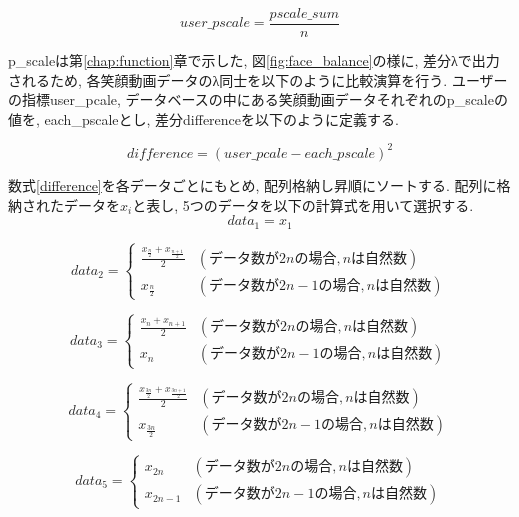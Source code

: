 \begin{equation}
\label{userpscale}
user\_pscale= \frac{pscale\_sum}{n}
\end{equation}

p\_scaleは第\ref{chap:function}章で示した, 図\ref{fig:face_balance}の様に,
差分λで出力されるため, 各笑顔動画データのλ同士を以下のように比較演算を行う.
ユーザーの指標user\_pcale, データベースの中にある笑顔動画データそれぞれのp\_scaleの値を,
each\_pscaleとし, 差分differenceを以下のように定義する.

\begin{equation}
\label{difference}
difference =
\left(
user\_pcale - each\_pscale
\right)
^2
\end{equation}

数式\ref{difference}を各データごとにもとめ, 配列格納し昇順にソートする.
配列に格納されたデータを$x_i$と表し, 5つのデータを以下の計算式を用いて選択する.
\begin{equation}
\label{data1}
data_1  = x_1
\end{equation}

\begin{equation}
\label{data2}
data_2 = \left\{ \begin{array}{ll}
\frac{x_{\frac{n}{2}} + x_{\frac{n+1}{2}} }{2} & (データ数が2nの場合,nは自然数) \\
x_{\frac{n}{2}} & (データ数が2n-1の場合,nは自然数)
\end{array} \right.\end{equation}

\begin{equation}
  \label{data3}
  data_3 = \left\{ \begin{array}{ll}
  \frac{x_n + x_{n+1} }{2} & (データ数が2nの場合,nは自然数) \\
  x_n & (データ数が2n-1の場合,nは自然数)
  \end{array} \right.\end{equation}

\begin{equation}
  \label{data4}
  data_4 = \left\{ \begin{array}{ll}
  \frac{x_{\frac{3n}{2}} + x_{\frac{3n+1}{2}} }{2} & (データ数が2nの場合,nは自然数) \\
  x_{\frac{3n}{2}} & (データ数が2n-1の場合,nは自然数)
  \end{array} \right.\end{equation}


\begin{equation}
  \label{data5}
  data_5  = \left\{ \begin{array}{ll}
  x_{2n} & (データ数が2nの場合,nは自然数) \\
  x_{2n-1} & (データ数が2n-1の場合,nは自然数)
  \end{array} \right.\end{equation}

